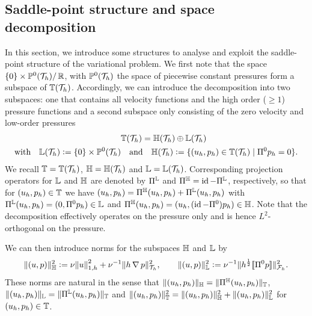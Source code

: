 \documentclass[pdflatex,sn-mathphys,Numbered]{sn-jnl}%
\theoremstyle{remark}%
\theoremstyle{definition}%
\begin{document}
\subsection{Saddle-point structure and space decomposition}
In this section, we introduce some structures to analyse and exploit the saddle-point
structure of the variational problem. 
We first note that the space $\{0\} \times \mathbb{P}^0({\mathcal{T}_h}) /\,\mathbb{R}$, with $\mathbb{P}^0({\mathcal{T}_h})$ the space of piecewise
constant pressures form a subspace of $\mathbb{T}({\mathcal{T}_h})$. Accordingly, we can introduce the
decomposition into two subspaces: one that contains all velocity functions and
the high order ($\geq 1$) pressure functions and a second subspace only
consisting of the zero velocity and low-order pressures 
\begin{align} \begin{split}
    &\mathbb{T}({\mathcal{T}_h}) = \mathbb{H}({\mathcal{T}_h}) \oplus \mathbb{L}({\mathcal{T}_h}) \\ 
    \text{with} \quad \mathbb{L}({\mathcal{T}_h}) := \{0\} \times \mathbb{P}^0({\mathcal{T}_h}) &\quad \text{and} \quad \mathbb{H}({\mathcal{T}_h}) := \{(u_h,p_h) \in \mathbb{T}({\mathcal{T}_h}) \mid \Pi^0 p_h=0\}.
\end{split}\end{align}
We recall $\mathbb{T} = \mathbb{T}({\mathcal{T}_h})$, $\mathbb{H} = \mathbb{H}({\mathcal{T}_h})$ and $\mathbb{L} = \mathbb{L}({\mathcal{T}_h})$.
Corresponding projection operators for $\mathbb{L}$ and $\mathbb{H}$ are denoted by $\Pi^{\mathbb{L}}$ and
$\Pi^{\mathbb{H}} = \operatorname{id} -  \Pi^{\mathbb{L}}$, respectively, 
so that for $(u_h,p_h) \in \mathbb{T}$ we have $(u_h,p_h) = \Pi^{\mathbb{H}}(u_h,p_h) + \Pi^{\mathbb{L}}(u_h,p_h)$ with $  \Pi^{\mathbb{L}}(u_h,p_h) = (0, \Pi^0 p_h) \in \mathbb{L}$ and $ \Pi^{\mathbb{H}} (u_h, p_h) = (u_h, (\operatorname{id} - \Pi^0) p_h)\in \mathbb{H}$. 
Note that the decomposition effectively operates on the pressure only and is hence $L^2$-orthogonal on the pressure.

We can then introduce norms for the subspaces $\mathbb{H}$ and $\mathbb{L}$ by
\begin{align}
  \Vert (u,p) \Vert_{\mathbb{H}}^2 := \nu \norm{u}_{1,h}^2 + \nu^{-1} \Vert h \operatorname{\nabla} p \Vert_{{\mathcal{T}_h}}^2,  \qquad
  \Vert (u,p) \Vert_{\mathbb{L}}^2 := \nu^{-1} \Vert h^\frac12 [\![\Pi^0 p]\!] \Vert_{{\mathcal{F}_h}}^2.
\end{align}
These norms are natural in the sense that $\Vert (u_h,p_h) \Vert_{\mathbb{H}} =
\Vert \Pi^{\mathbb{H}}(u_h,p_h) \Vert_{\mathbb{T}}$,  $\Vert (u_h,p_h) \Vert_{\mathbb{L}} =
\Vert \Pi^{\mathbb{L}}(u_h,p_h) \Vert_{\mathbb{T}}$
and 
$
\Vert (u_h,p_h) \Vert_{\mathbb{T}}^2 = \Vert (u_h,p_h) \Vert_{\mathbb{H}}^2 +   \Vert (u_h,p_h) \Vert_{\mathbb{L}}^2
$
for $(u_h,p_h) \in \mathbb{T}$.
\end{document}
